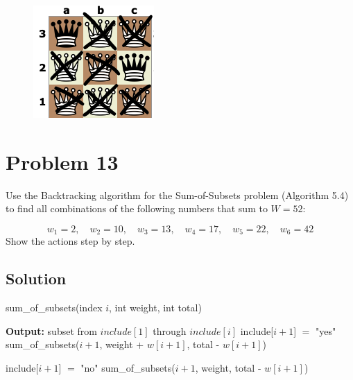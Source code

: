 \documentclass[12pt]{article}
\begin{document}
\begin{figure}[h]
\begin{minipage}{0.3\textwidth}
    \end{minipage}
    \hspace{0.03\textwidth}
    \begin{minipage}{0.3\textwidth}
        \centering
        \includegraphics[width=\textwidth]{Fig10.png}
    \end{minipage}
\end{figure}

\section*{Problem 13}
Use the Backtracking algorithm for the Sum-of-Subsets problem (Algorithm 5.4) to find all combinations of the following numbers that sum to \( W = 52 \):

\[
w_1 = 2, \quad w_2 = 10, \quad w_3 = 13, \quad w_4 = 17, \quad w_5 = 22, \quad w_6 = 42
\]
Show the actions step by step.
\subsection*{Solution}
\begin{algorithm}
    \caption{sum\_of\_subsets(index $i$, int weight, int total)}
    \begin{algorithmic}[1]
                \State \textbf{Output:} subset from $include[1]$ through $include[i]$
            \Else
                \State include[$i+1$] $=$ "yes"
                \State sum\_of\_subsets($i+1$, weight + $w[i+1]$, total - $w[i+1]$) 
                
                \State include[$i+1$] $=$ "no"
                \State sum\_of\_subsets($i+1$, weight, total - $w[i+1]$) 
            \EndIf
        \EndIf
    \end{algorithmic}
\end{algorithm}
\end{document}
